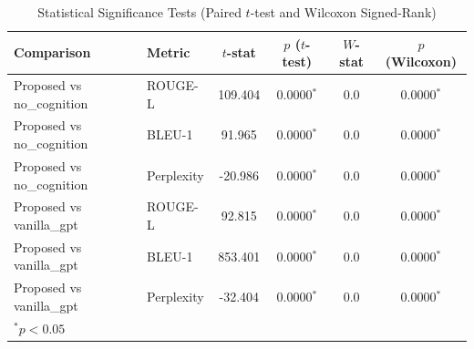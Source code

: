 \begin{table}[ht]
\centering
\caption{Statistical Significance Tests (Paired $t$-test and Wilcoxon Signed-Rank)}
\label{tab:significance}
\begin{tabular}{llcccc}
\toprule
\textbf{Comparison} & \textbf{Metric} & $t$-stat & $p$ ($t$-test) & $W$-stat & $p$ (Wilcoxon) \\
\midrule
Proposed vs no_cognition & ROUGE-L & 109.404 & 0.0000$^{*}$ & 0.0 & 0.0000$^{*}$ \\
Proposed vs no_cognition & BLEU-1 & 91.965 & 0.0000$^{*}$ & 0.0 & 0.0000$^{*}$ \\
Proposed vs no_cognition & Perplexity & -20.986 & 0.0000$^{*}$ & 0.0 & 0.0000$^{*}$ \\
Proposed vs vanilla_gpt & ROUGE-L & 92.815 & 0.0000$^{*}$ & 0.0 & 0.0000$^{*}$ \\
Proposed vs vanilla_gpt & BLEU-1 & 853.401 & 0.0000$^{*}$ & 0.0 & 0.0000$^{*}$ \\
Proposed vs vanilla_gpt & Perplexity & -32.404 & 0.0000$^{*}$ & 0.0 & 0.0000$^{*}$ \\
\bottomrule
\multicolumn{6}{l}{\footnotesize $^{*}p < 0.05$} \\
\end{tabular}
\end{table}
